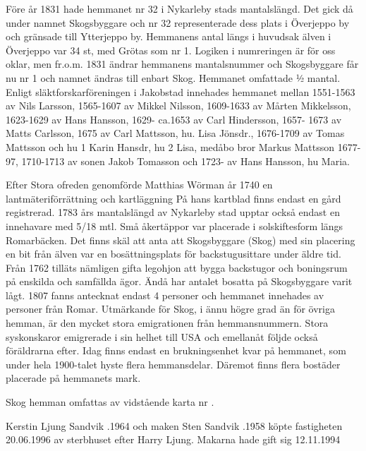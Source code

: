 
Före år 1831 hade hemmanet nr 32 i Nykarleby stads mantalslängd. Det gick då under namnet Skogsbyggare och nr 32 representerade dess plats i Överjeppo by och gränsade till Ytterjeppo by. Hemmanens antal längs i huvudsak älven i Överjeppo var 34 st, med Grötas som nr 1. Logiken i numreringen är för oss oklar, men fr.o.m. 1831 ändrar hemmanens mantalsnummer och Skogsbyggare får nu nr 1 och namnet ändras till enbart Skog. Hemmanet omfattade ½ mantal. Enligt släktforskarföreningen i Jakobstad innehades hemmanet mellan 1551-1563 av Nils Larsson, 1565-1607 av Mikkel Nilsson, 1609-1633 av Mårten Mikkelsson, 1623-1629 av Hans Hansson, 1629- ca.1653 av Carl Hindersson, 1657- 1673 av Matts Carlsson, 1675 av  Carl Mattsson, hu. Lisa Jönsdr., 1676-1709 av Tomas Mattsson och hu 1 Karin Hansdr, hu 2 Lisa, medåbo bror Markus Mattsson 1677-97, 1710-1713 av sonen Jakob Tomasson och 1723- av Hans Hansson, hu Maria.

Efter Stora ofreden genomförde Matthias Wörman år 1740 en lantmäteriförrättning och kartläggning På hans kartblad finns endast en gård registrerad. 1783 års mantalslängd av Nykarleby stad upptar också endast en innehavare med 5/18 mtl. Små åkertäppor var  placerade i solskiftesform längs Romarbäcken. Det finns skäl att anta att Skogsbyggare (Skog) med sin placering en bit från älven var en bosättningsplats för backstugusittare under äldre tid. Från 1762 tilläts nämligen gifta legohjon att bygga backstugor och boningsrum på enskilda och samfällda ägor. Ändå har antalet bosatta på Skogsbyggare varit lågt. 1807 fanns antecknat endast 4 personer och hemmanet innehades av personer från Romar.
Utmärkande för Skog, i ännu högre grad än för övriga hemman, är den mycket stora emigrationen från hemmansnummern. Stora syskonskaror emigrerade i sin helhet till USA och emellanåt följde också föräldrarna efter. Idag finns endast en brukningsenhet kvar på hemmanet, som under hela 1900-talet hyste flera hemmansdelar. Däremot finns flera bostäder placerade på hemmanets mark.

Skog hemman omfattas av vidstående karta nr .







Kerstin Ljung Sandvik .1964 och maken Sten Sandvik .1958 köpte fastigheten 20.06.1996 av sterbhuset efter Harry Ljung. Makarna hade gift sig 12.11.1994

